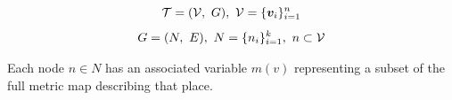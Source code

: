 \begin{equation}
    \label{eq:topometricmap}
    \topometricmap = (\voxelgrid,\ G),\ \voxelgrid=\{\voxel_{i}\}_{i=1}^{n}
\end{equation}
\begin{equation}
    \label{eq:place_subset}
    G=(N,\ E),\ N=\{n_i\}_{i=1}^k,\ n \subset \mathcal{V}
\end{equation}

Each node \(n \in N\) has an associated variable \(m(v)\) representing a subset of the full metric map describing that place.
